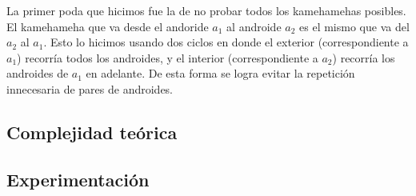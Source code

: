     La primer poda que hicimos fue la de no probar todos los kamehamehas posibles. El kamehameha que va desde el andoride $a_1$ al androide $a_2$ es el mismo que va del $a_2$ al $a_1$. Esto lo hicimos usando dos ciclos en donde el exterior (correspondiente a $a_1$) recorría todos los androides, y el interior (correspondiente a $a_2$) recorría los androides de $a_1$ en adelante. De esta forma se logra evitar la repetición innecesaria de pares de androides. \\


       
    \subsection{Complejidad teórica}
         
       


    \subsection{Experimentación}

